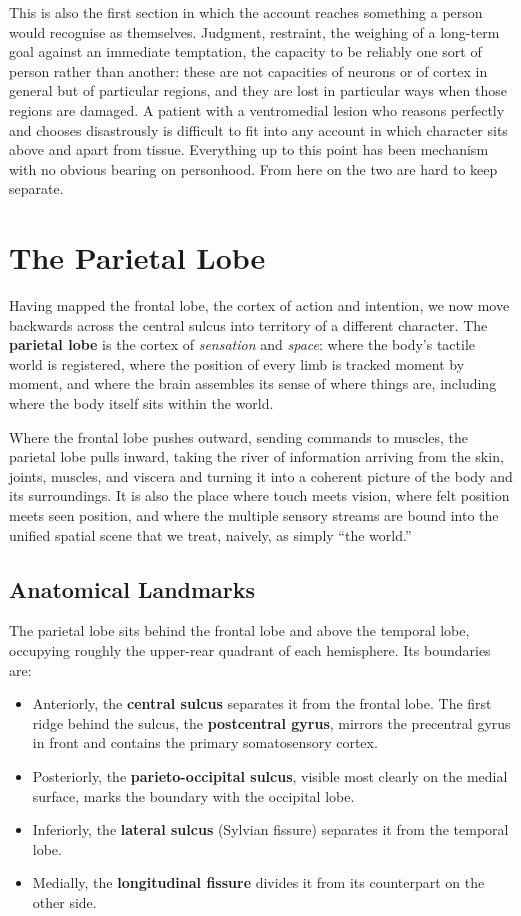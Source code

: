 \documentclass[11pt]{article}
\begin{document}
This is also the first section in which the account reaches something a person would recognise as themselves. Judgment, restraint, the weighing of a long-term goal against an immediate temptation, the capacity to be reliably one sort of person rather than another: these are not capacities of neurons or of cortex in general but of particular regions, and they are lost in particular ways when those regions are damaged. A patient with a ventromedial lesion who reasons perfectly and chooses disastrously is difficult to fit into any account in which character sits above and apart from tissue. Everything up to this point has been mechanism with no obvious bearing on personhood. From here on the two are hard to keep separate.

\section{The Parietal Lobe}

Having mapped the frontal lobe, the cortex of action and intention, we now move backwards across the central sulcus into territory of a different character. The \textbf{parietal lobe} is the cortex of \textit{sensation} and \textit{space}: where the body's tactile world is registered, where the position of every limb is tracked moment by moment, and where the brain assembles its sense of where things are, including where the body itself sits within the world.

Where the frontal lobe pushes outward, sending commands to muscles, the parietal lobe pulls inward, taking the river of information arriving from the skin, joints, muscles, and viscera and turning it into a coherent picture of the body and its surroundings. It is also the place where touch meets vision, where felt position meets seen position, and where the multiple sensory streams are bound into the unified spatial scene that we treat, naively, as simply ``the world.''

\subsection{Anatomical Landmarks}

The parietal lobe sits behind the frontal lobe and above the temporal lobe, occupying roughly the upper-rear quadrant of each hemisphere. Its boundaries are:

\begin{itemize}
    \item Anteriorly, the \textbf{central sulcus} separates it from the frontal lobe. The first ridge behind the sulcus, the \textbf{postcentral gyrus}, mirrors the precentral gyrus in front and contains the primary somatosensory cortex.
    \item Posteriorly, the \textbf{parieto-occipital sulcus}, visible most clearly on the medial surface, marks the boundary with the occipital lobe.
    \item Inferiorly, the \textbf{lateral sulcus} (Sylvian fissure) separates it from the temporal lobe.
    \item Medially, the \textbf{longitudinal fissure} divides it from its counterpart on the other side.
\end{itemize}
\end{document}
